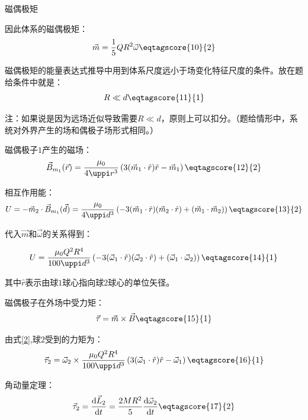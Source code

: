 \documentclass[answer]{cphos}
\begin{document}
\begin{problem}[50]{磁偶极矩}
\begin{solution}
因此体系的磁偶极矩：
\begin{equation}
	\vec{m}=\frac{1}{5}QR^2\vec{\omega}\eqtagscore{10}{2}
\end{equation}

磁偶极矩的能量表达式推导中用到体系尺度远小于场变化特征尺度的条件。放在题给条件中就是：
\begin{equation}
	R\ll d\eqtagscore{11}{1}
\end{equation}

注：如果说是因为远场近似导致需要\(R\ll d\)，原则上可以扣分。（题给情形中，系统对外界产生的场和偶极子场形式相同。）

磁偶极子\(1\)产生的磁场：
\begin{equation}
	\vec{B}_{m_1}(\vec{r})=\frac{\mu_0}{4\uppi r^3}\left(3(\vec{m}_1\cdot\hat{r})\hat{r}-\vec{m}_1\right)\eqtagscore{12}{2}\label{2}
\end{equation}

相互作用能：
\begin{equation}
	U=-\vec{m}_2\cdot\vec{B}_{m_1}(\vec{d})=\frac{\mu_0}{4\uppi d^3}\left(-3(\vec{m}_1\cdot\hat{r})(\vec{m}_2\cdot\hat{r})+(\vec{m}_1\cdot\vec{m}_2)\right)\eqtagscore{13}{2}
\end{equation}

代入\(\vec{m}\)和\(\vec{\omega}\)的关系得到：

\begin{equation}
	U=\frac{\mu_0 Q^2R^4}{100\uppi d^3}\left(-3(\vec{\omega}_1\cdot\hat{r})(\vec{\omega}_2\cdot\hat{r})+(\vec{\omega}_1\cdot\vec{\omega}_2)\right)\eqtagscore{14}{1}\label{5}
\end{equation}

其中\(\hat{r}\)表示由球\(1\)球心指向球\(2\)球心的单位矢径。

磁偶极子在外场中受力矩：
\begin{equation}
	\vec{\tau}=\vec{m}\times\vec{B}\eqtagscore{15}{1}
\end{equation}

由式\ref{2},球\(2\)受到的力矩为：
\begin{equation}
	\vec{\tau}_2=\vec{\omega}_2\times\frac{\mu_0 Q^2R^4}{100\uppi d^3}\left(3(\vec{\omega}_1\cdot\hat{r})\hat{r}-\vec{\omega}_1\right)\eqtagscore{16}{1}
\end{equation}

角动量定理：
\begin{equation}
	\vec{\tau}_2=\frac{\mathrm{d}\vec{L}_2}{\mathrm{d}t}=\frac{2MR^2}{5}\frac{\mathrm{d}\vec{\omega}_2}{\mathrm{d}t}\eqtagscore{17}{2}
\end{equation}


\end{solution}
\end{problem}
\end{document}
